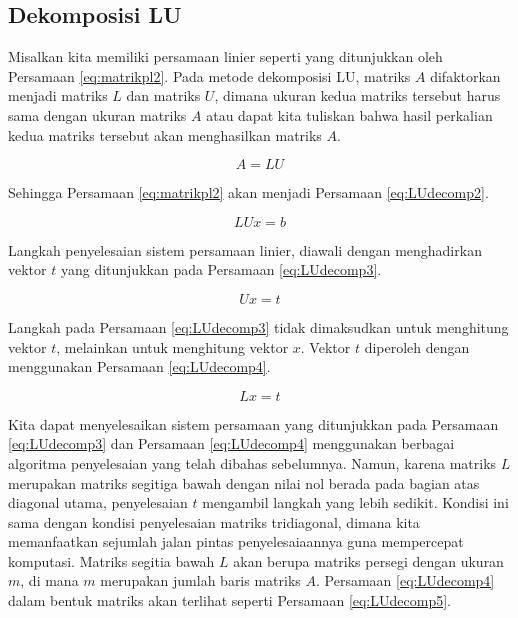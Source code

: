 \documentclass[]{book}
\theoremstyle{definition}
\theoremstyle{definition}
\theoremstyle{definition}
\theoremstyle{remark}
\begin{document}
\hypertarget{ludecomp}{%
\subsection{Dekomposisi LU}\label{ludecomp}}

Misalkan kita memiliki persamaan linier seperti yang ditunjukkan oleh Persamaan \eqref{eq:matrikpl2}. Pada metode dekomposisi LU, matriks \(A\) difaktorkan menjadi matriks \(L\) dan matriks \(U\), dimana ukuran kedua matriks tersebut harus sama dengan ukuran matriks \(A\) atau dapat kita tuliskan bahwa hasil perkalian kedua matriks tersebut akan menghasilkan matriks \(A\).

\begin{equation}
A=LU
 \label{eq:LUdecomp}
\end{equation}

Sehingga Persamaan \eqref{eq:matrikpl2} akan menjadi Persamaan \eqref{eq:LUdecomp2}.

\begin{equation}
LUx=b
 \label{eq:LUdecomp2}
\end{equation}

Langkah penyelesaian sistem persamaan linier, diawali dengan menghadirkan vektor \(t\) yang ditunjukkan pada Persamaan \eqref{eq:LUdecomp3}.

\begin{equation}
Ux=t
 \label{eq:LUdecomp3}
\end{equation}

Langkah pada Persamaan \eqref{eq:LUdecomp3} tidak dimaksudkan untuk menghitung vektor \(t\), melainkan untuk menghitung vektor \(x\). Vektor \(t\) diperoleh dengan menggunakan Persamaan \eqref{eq:LUdecomp4}.

\begin{equation}
Lx=t
 \label{eq:LUdecomp4}
\end{equation}

Kita dapat menyelesaikan sistem persamaan yang ditunjukkan pada Persamaan \eqref{eq:LUdecomp3} dan Persamaan \eqref{eq:LUdecomp4} menggunakan berbagai algoritma penyelesaian yang telah dibahas sebelumnya. Namun, karena matriks \(L\) merupakan matriks segitiga bawah dengan nilai nol berada pada bagian atas diagonal utama, penyelesaian \(t\) mengambil langkah yang lebih sedikit. Kondisi ini sama dengan kondisi penyelesaian matriks tridiagonal, dimana kita memanfaatkan sejumlah jalan pintas penyelesaiaannya guna mempercepat komputasi. Matriks segitia bawah \(L\) akan berupa matriks persegi dengan ukuran \(m\), di mana \(m\) merupakan jumlah baris matriks \(A\). Persamaan \eqref{eq:LUdecomp4} dalam bentuk matriks akan terlihat seperti Persamaan \eqref{eq:LUdecomp5}.
\end{document}
